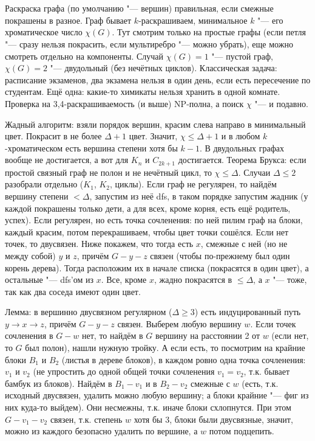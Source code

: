 \section{} %
	Раскраска графа (по умолчанию "--- вершин) правильная, если смежные покрашены в разное.
	Граф бывает $k$-раскрашиваем, минимальное $k$ "--- его хроматическое число $\chi(G)$.
	Тут смотрим только на простые графы (если петля "--- сразу нельзя покрасить, если мультиребро "--- можно убрать),
	еще можно смотреть отдельно на компоненты.
	Случай $\chi(G)=1$ "--- пустой граф, $\chi(G)=2$ "--- двудольный (без нечётных циклов).
	Классическая задача: расписание экзаменов, два экзамена нельзя в один день, если есть пересечение по студентам.
	Ещё одна: какие-то химикаты нельзя хранить в одной комнате.
	Проверка на 3,4-раскрашиваемость (и выше) NP-полна, а поиск $\chi$ "--- и подавно.

	Жадный алгоритм: взяли порядок вершин, красим слева направо в минимальный цвет.
	Покрасит в не более $\Delta+1$ цвет.
	Значит, $\chi\le\Delta+1$ и в любом $k$-хроматическом есть вершина степени хотя бы $k-1$.
	В двудольных графах вообще не достигается, а вот для $K_n$ и $C_{2k+1}$ достигается.
	Теорема Брукса: если простой связный граф не полон и не нечётный цикл, то $\chi \le \Delta$.
	Случаи $\Delta \le 2$ разобрали отдельно ($K_1$, $K_2$, циклы).
	Если граф не регулярен, то найдём вершину степени $<\Delta$, запустим из неё dfs, в таком порядке запустим жадник
	(у каждой покрашены только дети, а для всех, кроме корня, есть ещё родитель, успех).
	Если регулярен, но есть точка сочленения: по ней пилим граф на блоки, каждый красим, потом перекрашиваем, чтобы цвет точки сошёлся.
	Если нет точек, то двусвязен.
	Ниже покажем, что тогда есть $x$, смежные с ней (но не между собой) $y$ и $z$, причём $G-y-z$ связен (чтобы по-прежнему был один корень дерева).
	Тогда расположим их в начале списка (покрасятся в один цвет), а остальные "--- dfs'ом из $x$.
	Все, кроме $x$, жадно покрасятся в $\le \Delta$, а $x$ "--- тоже, так как два соседа имеют один цвет.

	Лемма: в вершинно двусвязном регулярном ($\Delta \ge 3$) есть индуцированный путь $y \to x \to z$, причём $G-y-z$ связен.
	Выберем любую вершину $w$.
	Если точек сочленения в $G-w$ нет, то найдём в $G$ вершину на расстоянии 2 от $w$ (если нет, то $G$ был полон), нашли нужную тройку.
	А если есть, то посмотрим на крайние блоки $B_1$ и $B_2$ (листья в дереве блоков), в каждом ровно одна точка сочленения: $v_1$ и $v_2$
	(не упростить до одной общей точки сочленения $v_1=v_2$, т.к. бывает бамбук из блоков).
	Найдём в $B_1-v_1$ и в $B_2-v_2$ смежные с $w$ (есть, т.к. исходный двусвязен, удалить можно любую вершину; а блоки крайние "--- фиг из них куда-то выйдем).
	Они несмежны, т.к. иначе блоки схлопнутся.
	При этом $G-v_1-v_2$ связен, т.к. степень $w$ хотя бы 3, блоки были двусвязные, значит, можно из каждого безопасно удалить по вершине,
	а $w$ потом подцепить.

